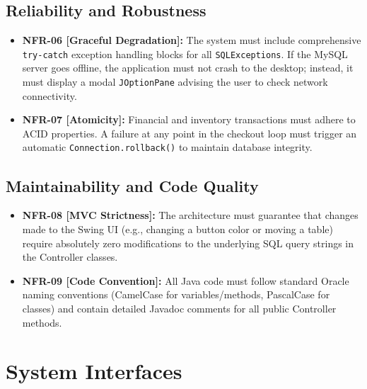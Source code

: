 \documentclass[12pt,a4paper]{report}
\begin{document}
\section{Reliability and Robustness}
\begin{itemize}
    \item \textbf{NFR-06 [Graceful Degradation]:} The system must include comprehensive \texttt{try-catch} exception handling blocks for all \texttt{SQLExceptions}. If the MySQL server goes offline, the application must not crash to the desktop; instead, it must display a modal \texttt{JOptionPane} advising the user to check network connectivity.
    \item \textbf{NFR-07 [Atomicity]:} Financial and inventory transactions must adhere to ACID properties. A failure at any point in the checkout loop must trigger an automatic \texttt{Connection.rollback()} to maintain database integrity.
\end{itemize}

\section{Maintainability and Code Quality}
\begin{itemize}
    \item \textbf{NFR-08 [MVC Strictness]:} The architecture must guarantee that changes made to the Swing UI (e.g., changing a button color or moving a table) require absolutely zero modifications to the underlying SQL query strings in the Controller classes.
    \item \textbf{NFR-09 [Code Convention]:} All Java code must follow standard Oracle naming conventions (CamelCase for variables/methods, PascalCase for classes) and contain detailed Javadoc comments for all public Controller methods.
\end{itemize}

\clearpage

\chapter{System Interfaces}
\end{document}
